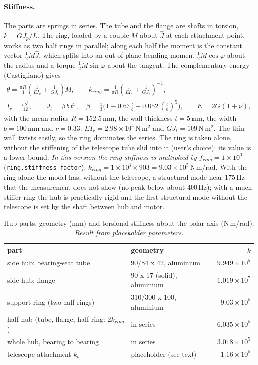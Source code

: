 \documentclass[10pt,a4paper]{article}
\numberwithin{equation}{section}
\begin{document}
\paragraph{Stiffness.} The parts are springs in series. The tube and the flange are shafts in torsion, $k = G J_p/L$. The ring, loaded by a couple $M$ about $\hat J$ at each attachment point, works as two half rings in parallel; along each half the moment is the constant vector $\tfrac12 M\hat J$, which splits into an out-of-plane bending moment $\tfrac12 M\cos\varphi$ about the radius and a torque $\tfrac12 M\sin\varphi$ about the tangent. The complementary energy (Castigliano) gives
\begin{gather}
\theta = \frac{\pi R}{4}\left(\frac{1}{E I_r} + \frac{1}{G J_t}\right) M,\qquad k_{ring} = \frac{4}{\pi R}\left(\frac{1}{E I_r} + \frac{1}{G J_t}\right)^{-1},\\
I_r = \frac{t\,b^3}{12},\qquad J_t = \beta\,b\,t^3,\quad \beta = \tfrac13\bigl(1 - 0.63\,\tfrac tb + 0.052\,(\tfrac tb)^5\bigr),\qquad E = 2G(1 + \nu),
\end{gather}
with the mean radius $R = 152.5$\,mm, the wall thickness $t = 5$\,mm, the width $b = 100$\,mm and $\nu = 0.33$: $E I_r = 2.98\times10^{4}$\,N\,m$^2$ and $G J_t = 109$\,N\,m$^2$. The thin wall twists easily, so the ring dominates the series. The ring is taken alone, without the stiffening of the telescope tube slid into it (user's choice): its value is a lower bound. \emph{In this version the ring stiffness is multiplied by $f_{ring} = 1\times10^{3}$} (\texttt{ring.stiffness\_factor}): $k_{ring} = 1\times10^{3} \times 903 = 9.03\times10^{5}$\,N\,m/rad. With the ring alone the model has, without the telescope, a structural mode near 175\,Hz that the measurement does not show (no peak below about 400\,Hz); with a much stiffer ring the hub is practically rigid and the first structural mode without the telescope is set by the shaft between hub and motor.
\begin{table}[H]\centering\small
\caption{Hub parts, geometry (mm) and torsional stiffness about the polar axis (N\,m/rad). \emph{Result from placeholder parameters.}}\label{tab:hub_parts}
\begin{tabular}{llr}\toprule
part & geometry & $k$ \\ \midrule
side hub: bearing-seat tube & 90/84 x 42, aluminium & $9.949\times10^{5}$ \\
side hub: flange & 90 x 17 (solid), aluminium & $1.019\times10^{7}$ \\
support ring (two half rings) & 310/300 x 100, aluminium & $9.03\times10^{5}$ \\
\midrule
half hub (tube, flange, half ring: $2k_{ring}$) & in series & $6.035\times10^{5}$ \\
whole hub, bearing to bearing & in series & $3.018\times10^{5}$ \\
telescope attachment $k_b$ & placeholder (see text) & $1.16\times10^{5}$ \\
\bottomrule\end{tabular}\end{table}
\end{document}
